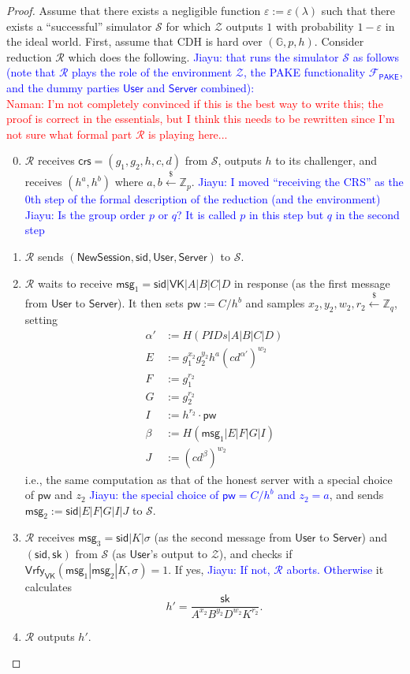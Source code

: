 \documentclass[12pt,a4paper]{article}
\newcommand{\simulator}{\mathcal{S}}
\newcommand{\env}{\mathcal{Z}}
\newcommand{\pake}{\mathcal{F}_{\mathsf{PAKE}}}
\newcommand{\user}{\mathsf{User}}
\newcommand{\sk}{\mathsf{sk}}
\newcommand{\pw}{\mathsf{pw}}
\newcommand{\newsession}{\mathsf{NewSession}}
\newcommand{\server}{\mathsf{Server}}
\newcommand{\msg}[1]{\mathsf{msg}_{#1}}
\newcommand{\rgets}{\xleftarrow{\$}}
\def\xjy#1{\textcolor{blue}{Jiayu: #1}}
\def\nam#1{\textcolor{red}{Naman: #1}}
\begin{document}
\begin{proof}
	Assume that there exists a negligible function $\varepsilon:=\varepsilon(\lambda)$ such that there exists a ``successful'' simulator $\simulator$ for which $\env$ outputs $1$ with probability $1-\varepsilon$ in the ideal world. First, assume that CDH is hard over $(\mathbb{G}, p, h)$. Consider reduction $\mathcal{R}$ which does the following. \xjy{that runs the simulator $\simulator$ as follows (note that $\mathcal{R}$ plays the role of the environment $\env$, the PAKE functionality $\pake$, and the dummy parties $\user$ and $\server$ combined):}\\
	
	\nam{I'm not completely convinced if this is the best way to write this; the proof is correct in the essentials, but I think this needs to be rewritten since I'm not sure what formal part $\mathcal{R}$ is playing here...}
	
	\begin{enumerate}\setcounter{enumi}{-1}
        \item $\mathcal{R}$ receives $\mathsf{crs}=(g_1, g_2, h, c, d)$ from $\simulator$, outputs $h$ to its challenger, and receives $(h^a, h^b)$ where $a,b\rgets\mathbb{Z}_p$. \xjy{I moved ``receiving the CRS'' as the 0th step of the formal description of the reduction (and the environment)} \xjy{Is the group order $p$ or $q$? It is called $p$ in this step but $q$ in the second step}
		\item $\mathcal{R}$ sends $(\newsession,\mathsf{sid}, \user, \server)$ to $\simulator$.
		\item $\mathcal{R}$ waits to receive $\msg{1} = \mathsf{sid}|\mathsf{VK}|A|B|C|D$ in response (as the first message from $\user$ to $\server$). It then sets $\pw:=C/h^b$ and samples $x_2,y_2,w_2,r_2\rgets\mathbb{Z}_q$, setting
		\begin{align*}
			\alpha'&:=H(PIDs|A|B|C|D)\\
			E &:= g_1^{x_2}g_2^{y_2}h^{a}(cd^{\alpha'})^{w_2}\\
			F &:= g_1^{r_2}\\
			G &:= g_2^{r_2}\\
			I &:= h^{r_2}\cdot\pw\\
			\beta &:= H(\msg{1}|E|F|G|I)\\
			J &:= (cd^{\beta})^{w_2}
		\end{align*}
		i.e., the same computation as that of the honest server with a special choice of $\pw$ and $z_2$ \xjy{the special choice of $\pw = C/h^b$ and $z_2 = a$}, and sends $\msg{2}:=\mathsf{sid}|E|F|G|I|J$ to $\simulator$.
		\item $\mathcal{R}$ receives $\msg{3}=\mathsf{sid}|K|\sigma$ (as the second message from $\user$ to $\server$) and $(\mathsf{sid},\sk)$ from $\simulator$ (as $\user$'s output to $\env$), and checks if $\mathsf{Vrfy}_\mathsf{VK}(\msg{1}|\msg{2}|K,\sigma)=1$. If yes, \xjy{If not, $\mathcal{R}$ aborts. Otherwise} it calculates 
		$$h'=\frac{\sk}{A^{x_2}B^{y_2}D^{w_2}K^{r_2}}.$$
		\item $\mathcal{R}$ outputs $h'$.		
	\end{enumerate}


\end{proof}
\end{document}
